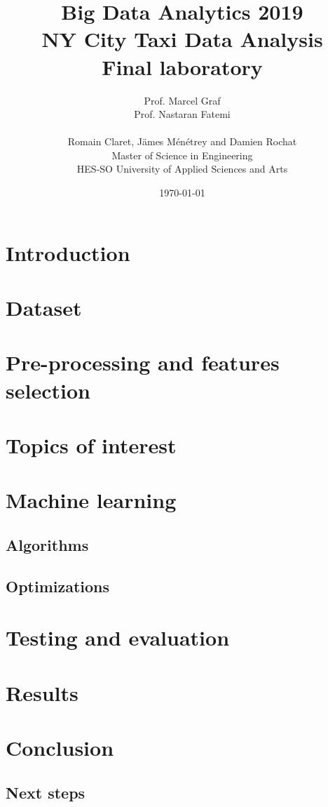﻿\documentclass[a4paper]{article}
\title{
\Large{Big Data Analytics 2019}\\
\huge{NY City Taxi Data Analysis}\\
\large{Final laboratory}}
\author{
Prof. Marcel Graf\\
Prof. Nastaran Fatemi\\
\\
Romain Claret, Jämes Ménétrey and Damien Rochat\\
Master of Science in Engineering\\
HES-SO University of Applied Sciences and Arts
\date{\today}}
\begin{document}
\maketitle

\tableofcontents

\section{Introduction}

\section{Dataset}

\section{Pre-processing and features selection}

\section{Topics of interest}

\section{Machine learning}
\subsection{Algorithms}
\subsection{Optimizations}

\section{Testing and evaluation}

\section{Results}

\section{Conclusion}
\subsection{Next steps}
\end{document}
